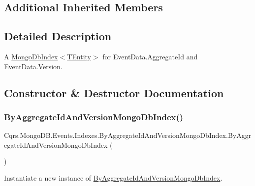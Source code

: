 \subsection*{Additional Inherited Members}


\subsection{Detailed Description}
A \hyperlink{classCqrs_1_1MongoDB_1_1DataStores_1_1Indexes_1_1MongoDbIndex_a61f4b17dd968f92e81562c70ae062a89_a61f4b17dd968f92e81562c70ae062a89}{Mongo\+Db\+Index$<$\+T\+Entity$>$} for Event\+Data.\+Aggregate\+Id and Event\+Data.\+Version. 



\subsection{Constructor \& Destructor Documentation}
\mbox{\label{classCqrs_1_1MongoDB_1_1Events_1_1Indexes_1_1ByAggregateIdAndVersionMongoDbIndex_a084cc895e473e0e0ea2dbcf81bba4514_a084cc895e473e0e0ea2dbcf81bba4514}} 
\subsubsection{\texorpdfstring{By\+Aggregate\+Id\+And\+Version\+Mongo\+Db\+Index()}{ByAggregateIdAndVersionMongoDbIndex()}}
{\footnotesize\ttfamily Cqrs.\+Mongo\+D\+B.\+Events.\+Indexes.\+By\+Aggregate\+Id\+And\+Version\+Mongo\+Db\+Index.\+By\+Aggregate\+Id\+And\+Version\+Mongo\+Db\+Index (\begin{DoxyParamCaption}{ }\end{DoxyParamCaption})}



Instantiate a new instance of \hyperlink{classCqrs_1_1MongoDB_1_1Events_1_1Indexes_1_1ByAggregateIdAndVersionMongoDbIndex}{By\+Aggregate\+Id\+And\+Version\+Mongo\+Db\+Index}. 

